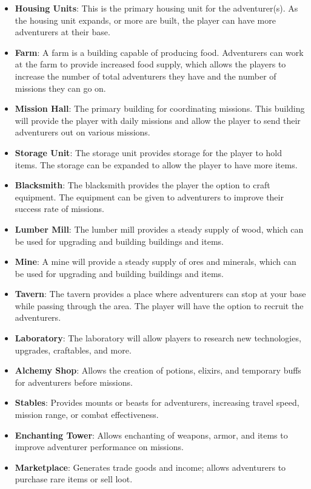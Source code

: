 \begin{itemize}[noitemsep, topsep=0pt]
	\item \textbf{Housing Units}: This is the primary housing unit for the adventurer(s). As the housing unit expands, or more are built, the player can have more adventurers at their base.
	\item \textbf{Farm}: A farm is a building capable of producing food. Adventurers can work at the farm to provide increased food supply, which allows the players to increase the number of total adventurers they have and the number of missions they can go on.
	\item \textbf{Mission Hall}: The primary building for coordinating missions. This building will provide the player with daily missions and allow the player to send their adventurers out on various missions.
	\item \textbf{Storage Unit}: The storage unit provides storage for the player to hold items. The storage can be expanded to allow the player to have more items.
	\item \textbf{Blacksmith}: The blacksmith provides the player the option to craft equipment. The equipment can be given to adventurers to improve their success rate of missions.
	\item \textbf{Lumber Mill}: The lumber mill provides a steady supply of wood, which can be used for upgrading and building buildings and items.
	\item \textbf{Mine}: A mine will provide a steady supply of ores and minerals, which can be used for upgrading and building buildings and items.
	\item \textbf{Tavern}: The tavern provides a place where adventurers can stop at your base while passing through the area. The player will have the option to recruit the adventurers.
	\item \textbf{Laboratory}: The laboratory will allow players to research new technologies, upgrades, craftables, and more.
 	\item \textbf{Alchemy Shop}: Allows the creation of potions, elixirs, and temporary buffs for adventurers before missions.
	\item \textbf{Stables}: Provides mounts or beasts for adventurers, increasing travel speed, mission range, or combat effectiveness.
	\item \textbf{Enchanting Tower}: Allows enchanting of weapons, armor, and items to improve adventurer performance on missions. 
	\item \textbf{Marketplace}: Generates trade goods and income; allows adventurers to purchase rare items or sell loot.

\end{itemize}
